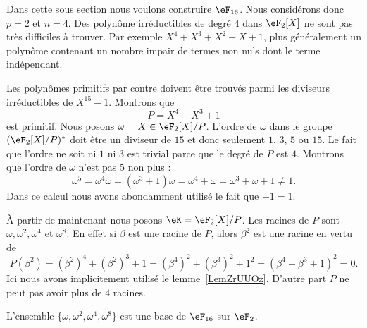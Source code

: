 Dans cette sous section nous voulons construire \( \eF_{16}\). Nous considérons donc \( p=2\) et \( n=4\). Des polynôme irréductibles de degré \( 4\) dans \( \eF_2[X]\) ne sont pas très difficiles à trouver. Par exemple \( X^4+X^3+X^2+X+1\), plus généralement un polynôme contenant un nombre impair de termes non nuls dont le terme indépendant.

Les polynômes primitifs par contre doivent être trouvés parmi les diviseurs irréductibles de \( X^{15}-1\). Montrons que
\begin{equation}
    P=X^4+X^3+1
\end{equation}
est primitif. Nous posons \( \omega=\bar X\in \eF_2[X]/P\). L'ordre de \( \omega\) dans le groupe \( (\eF_2[X]/P)^* \) doit être un diviseur de \( 15\) et donc seulement \( 1\), \( 3\), \( 5\) ou \( 15\). Le fait que l'ordre ne soit ni \( 1\) ni \( 3\) est trivial parce que le degré de \( P\) est \( 4\). Montrons que l'ordre de \( \omega\) n'est pas \( 5\) non plus :
\begin{equation}
    \omega^5=\omega^4\omega=(\omega^3+1)\omega=\omega^4+\omega=\omega^3+\omega+1\neq 1.
\end{equation}
Dans ce calcul nous avons abondamment utilisé le fait que \( -1=1\).

À partir de maintenant nous posons \( \eK=\eF_2[X]/P\). Les racines de \( P\) sont \( \omega,\omega^2,\omega^4\) et \( \omega^8\). En effet si \( \beta\) est une racine de \( P\), alors \( \beta^2\) est une racine en vertu de
\begin{equation}
    P(\beta^2)=(\beta^2)^4+(\beta^2)^3+1=(\beta^4)^2+(\beta^3)^2+1^2=(\beta^4+\beta^3+1)^2=0.
\end{equation}
Ici nous avons implicitement utilisé le lemme~\ref{LemZrUUOz}. D'autre part \( P\) ne peut pas avoir plus de \( 4\) racines.

\begin{proposition}
    L'ensemble \( \{ \omega,\omega^2,\omega^4,\omega^8 \}\) est une base de \( \eF_{16}\) sur \( \eF_2\).
\end{proposition}

